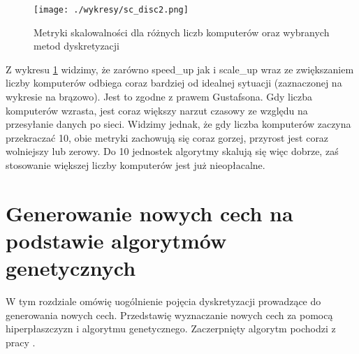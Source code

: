 \documentclass[magisterska]{pracamgr}
\theoremstyle{plain}
\theoremstyle{definition}
\theoremstyle{remark}
\begin{document}
\begin{figure}\label{fig:sc_disc}
 \caption{Metryki skalowalności dla różnych liczb komputerów oraz wybranych metod dyskretyzacji}
 \centering\texttt{[image: ./wykresy/sc\_disc2.png]}
\end{figure}

Z wykresu \ref{fig:sc_disc} widzimy, że zarówno speed\_up jak i scale\_up wraz ze zwiększaniem liczby komputerów odbiega coraz bardziej od idealnej sytuacji 
(zaznaczonej na wykresie na brązowo). Jest to zgodne z prawem Gustafsona. Gdy liczba komputerów wzrasta, jest coraz większy narzut czasowy
ze względu na przesyłanie danych po sieci. Widzimy jednak, że gdy liczba komputerów zaczyna przekraczać 10, obie 
metryki zachowują się coraz gorzej, przyrost jest coraz wolniejszy lub zerowy. Do 10 jednostek algorytmy skalują się więc dobrze, 
zaś stosowanie większej liczby komputerów jest już nieopłacalne.



\chapter{Generowanie nowych cech na podstawie algorytmów genetycznych}

W tym rozdziale omówię uogólnienie pojęcia dyskretyzacji prowadzące do generowania nowych cech.
Przedstawię wyznaczanie nowych cech za pomocą hiperpłaszczyzn i algorytmu genetycznego. Zaczerpnięty algorytm
pochodzi z pracy \cite{Hyperplanes}.
\end{document}
